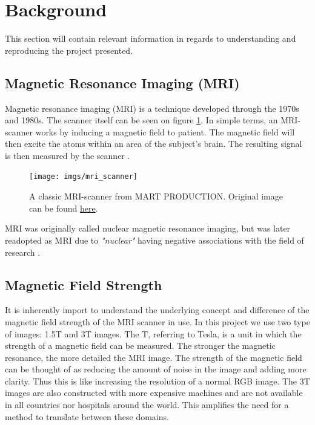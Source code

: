 \documentclass[12pt, fleqn, titlepage]{article}
\begin{document}
\section{Background}

This section will contain relevant information in regards to understanding and reproducing the project presented. 

\subsection{Magnetic Resonance Imaging (MRI)}
Magnetic resonance imaging (MRI) is a technique developed through the 1970s and 1980s. The scanner itself can be seen on figure \ref{fig:mriscanner}. In simple terms, an MRI-scanner works by inducing a magnetic field to patient. The magnetic field will then excite the atoms within an area of the subject's brain. The resulting signal is then measured by the scanner \cite{mri}.  
\begin{figure}[H]
	\centering
	\texttt{[image: imgs/mri\_scanner]}
	\caption{A classic MRI-scanner from MART PRODUCTION. Original image can be found \href{https://www.pexels.com/photo/technology-hospital-medicine-indoors-7089017/}{here}. }
	\label{fig:mriscanner}
\end{figure}

MRI was originally called nuclear magnetic resonance imaging, but was later readopted as MRI due to \textit{"nuclear"} having negative associations with the field of research \cite{wiki} \cite{mri2}.

\subsection{Magnetic Field Strength}
It is inherently import to understand the underlying concept and difference of the magnetic field strength of the MRI scanner in use. In this project we use two type of images: 1.5T and 3T images. The T, referring to Tesla, is a unit in which the strength of a magnetic field can be measured. The stronger the magnetic resonance, the more detailed the MRI image. The strength of the magnetic field can be thought of as reducing the amount of noise in the image and adding more clarity. Thus this is like increasing the resolution of a normal RGB image. The 3T images are also constructed with more expensive machines and are not available in all countries nor hospitals around the world. This amplifies the need for a method to translate between these domains. 
\end{document}
